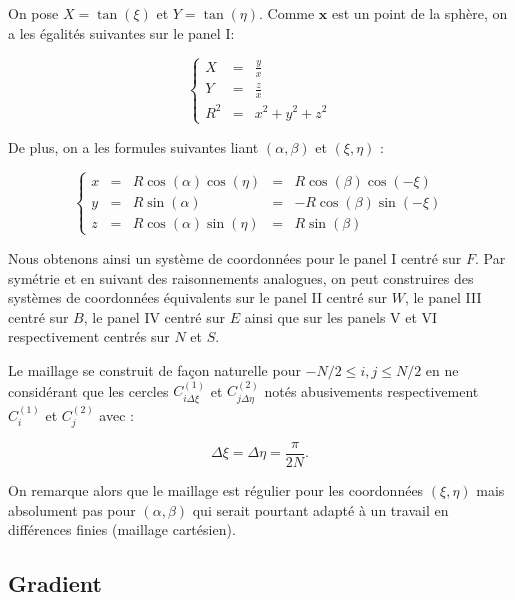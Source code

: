 On pose $X = \tan ( \xi )$ et $Y = \tan ( \eta )$. Comme $\mathbf{x}$ est un point de la sphère, on a les égalités suivantes sur le panel I:

\begin{equation}
\left\{
\begin{array}{rcl}
  X &=& \frac{y}{x} \\
  Y &=& \frac{z}{x} \\
  R^2 &=& x^2 + y^2 + z^2
\end{array}
\right.
\label{coordgno}
\end{equation}

De plus, on a les formules suivantes liant $( \alpha, \beta)$ et $( \xi, \eta )$ :

\begin{equation}
\left\{
\begin{array}{rcccl}
  x &=& R \cos ( \alpha ) \cos ( \eta ) &=& R \cos ( \beta ) \cos ( - \xi ) \\
  y &=& R \sin ( \alpha ) &=& - R \cos ( \beta ) \sin ( - \xi ) \\
  z &=& R \cos ( \alpha ) \sin ( \eta ) &=& R \sin ( \beta )
\end{array}
\right.
\label{coord}
\end{equation}

Nous obtenons ainsi un système de coordonnées pour le panel I centré sur $F$. Par symétrie et en suivant des raisonnements analogues, on peut construires des systèmes de coordonnées équivalents sur le panel II centré sur $W$, le panel III centré sur $B$, le panel IV centré sur $E$ ainsi que sur les panels V et VI respectivement centrés sur $N$ et $S$.

Le maillage se construit de façon naturelle pour $-N/2 \leq i,j \leq N/2$ en ne considérant que les cercles $C^{(1)}_{i \Delta \xi}$ et $C^{(2)}_{j \Delta \eta}$ notés abusivements respectivement $C^{(1)}_i$ et $C^{(2)}_j$ avec :

\begin{equation}
\Delta \xi = \Delta \eta = \dfrac{\pi}{2  N }. 
\end{equation}

On remarque alors que le maillage est régulier pour les coordonnées $(\xi, \eta)$ mais absolument pas pour $(\alpha, \beta)$ qui serait pourtant adapté à un travail en différences finies (maillage cartésien).

\subsection{Gradient}

